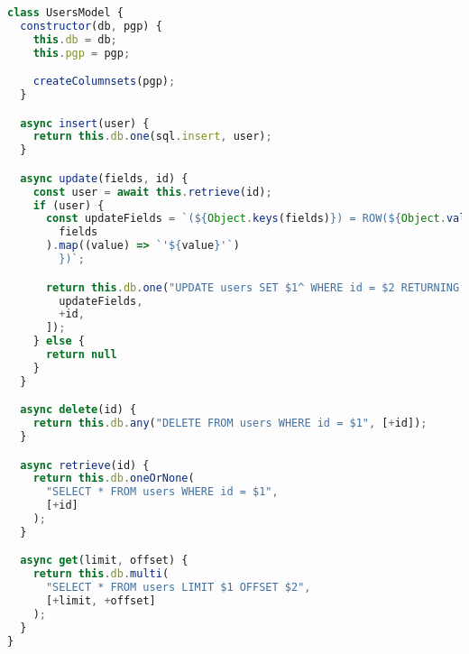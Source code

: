 \begin{lstlisting}[language=JavaScript,caption={Express.js user model},breaklines=true,label={lst:expressModel}]
class UsersModel {
  constructor(db, pgp) {
    this.db = db;
    this.pgp = pgp;

    createColumnsets(pgp);
  }

  async insert(user) {
    return this.db.one(sql.insert, user);
  }

  async update(fields, id) {
    const user = await this.retrieve(id);
    if (user) {
      const updateFields = `(${Object.keys(fields)}) = ROW(${Object.values(
        fields
      ).map((value) => `'${value}'`)
        })`;

      return this.db.one("UPDATE users SET $1^ WHERE id = $2 RETURNING *", [
        updateFields,
        +id,
      ]);
    } else {
      return null
    }
  }

  async delete(id) {
    return this.db.any("DELETE FROM users WHERE id = $1", [+id]);
  }

  async retrieve(id) {
    return this.db.oneOrNone(
      "SELECT * FROM users WHERE id = $1",
      [+id]
    );
  }

  async get(limit, offset) {
    return this.db.multi(
      "SELECT * FROM users LIMIT $1 OFFSET $2",
      [+limit, +offset]
    );
  }
}
\end{lstlisting}
